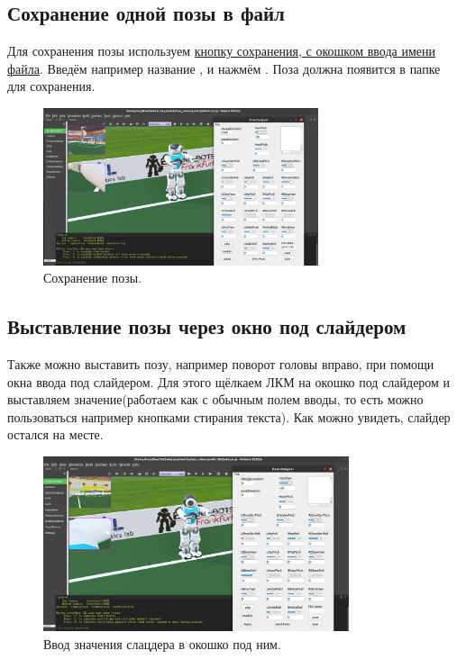 \documentclass[12pt,a4paper]{article}
\begin{document}
\subsection{Сохранение одной позы в файл}
Для сохранения позы используем \hyperref[save]{кнопку сохранения, с окошком ввода имени файла}. Введём например название , и нажмём . Поза должна появится в папке для сохранения.
\begin{figure}[h!]
    \centering
    \includegraphics[width = 0.72\textwidth]{./images/firstSave.png}
    \caption{Сохранение позы.}
    \label{fig:my_label}
\end{figure}
\newpage
\subsection{Выставление позы через окно под слайдером}
Также можно выставить позу, например поворот головы вправо, при помощи окна ввода под слайдером. Для этого щёлкаем ЛКМ на окошко под слайдером и выставляем значение(работаем как с обычным полем вводы, то есть можно пользоваться например кнопками стирания текста). Как можно увидеть, слайдер остался на месте.
\begin{figure}[h!]
    \centering
    \includegraphics[width = 0.8\textwidth]{./images/sliderChange.png}
    \caption{Ввод значения слацдера в окошко под ним.}
    \label{fig:my_label}
\end{figure}
\end{document}

